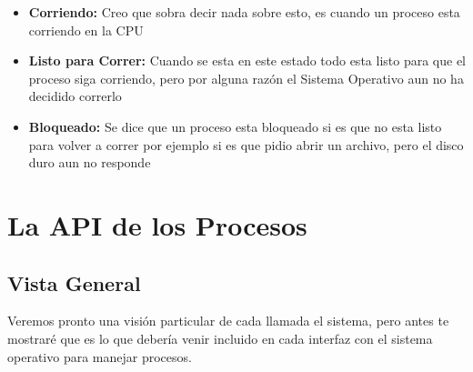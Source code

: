 \documentclass[12pt, fleqn]{report}                             %
\begin{document}
            \begin{itemize}
                \item
                    \textbf{Corriendo:}
                    Creo que sobra decir nada sobre esto, es cuando un proceso esta corriendo en la CPU

                \item
                    \textbf{Listo para Correr:}
                    Cuando se esta en este estado todo esta listo para que el proceso siga corriendo, pero
                    por alguna razón el Sistema Operativo aun no ha decidido correrlo

                \item
                    \textbf{Bloqueado:}
                    Se dice que un proceso esta bloqueado si es que no esta listo para volver a correr
                    por ejemplo si es que pidio abrir un archivo, pero el disco duro aun no responde
            \end{itemize}



        \clearpage
        \section{La API de los Procesos}

            \subsection{Vista General}

                Veremos pronto una visión particular de cada llamada el sistema, pero 
                antes te mostraré que es lo que debería venir incluido en cada interfaz
                con el sistema operativo para manejar procesos.
\end{document}
